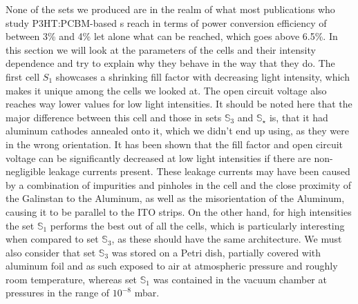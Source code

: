 \documentclass[a4paper,10pt,twocolumn]{article}
\begin{document}
\begin{extract*}

%
%
None of the sets we produced are in the realm of what most publications who study P3HT:PCBM-based \BHSC s reach in terms of power conversion efficiency of between 3\% and 4\% let alone what can be reached, which goes above 6.5\%\cite{source13}. In this section we will look at the parameters of the cells and their intensity dependence and try to explain why they behave in the way that they do.\mypar
The first cell $S_1$ showcases a shrinking fill factor with decreasing light intensity, which makes it unique among the cells we looked at. The open circuit voltage also reaches way lower values for low light intensities. It should be noted here that the major difference between this cell and those in sets $\mathbb{S}_3$ and $\mathbb{S}_\star$ is, that it had aluminum cathodes annealed onto it, which we didn't end up using, as they were in the wrong orientation. It has been shown\cite{source12} that the fill factor and open circuit voltage can be significantly decreased at low light intensities if there are non-negligible leakage currents present. These leakage currents may have been caused by a combination of impurities and pinholes in the cell and the close proximity of the Galinstan to the Aluminum, as well as the misorientation of the Aluminum, causing it to be parallel to the ITO strips.\mypar
On the other hand, for high intensities the set $\mathbb{S}_1$ performs the best out of all the cells, which is particularly interesting when compared to set $\mathbb{S}_3$, as these should have the same architecture. We must also consider that set $\mathbb{S}_3$ was stored on a Petri dish, partially covered with aluminum foil and as such exposed to air at atmospheric pressure and roughly room temperature, whereas set $\mathbb{S}_1$ was contained in the vacuum chamber at pressures in the range of $10^{-8}$ mbar.


\end{extract*}
\end{document}
